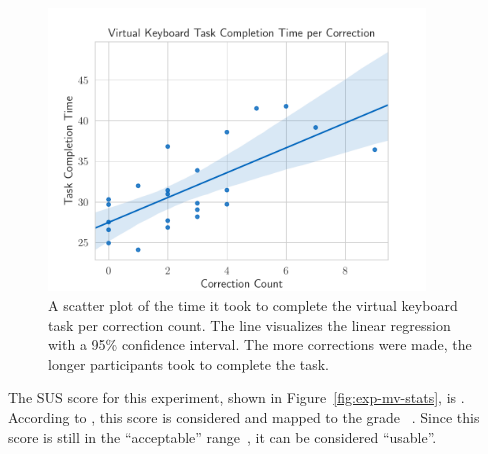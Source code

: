 \begin{figure}[H]
	\centering
	\includegraphics[width=10cm]{figures/evaluation/eval_exp_vk_ratio_scatter.pdf}
	\caption[Virtual keyboard task results]{A scatter plot of the time it took to complete the virtual keyboard task per correction count. The line visualizes the linear regression with a 95\% confidence interval. The more corrections were made, the longer participants took to complete the task.}\label{fig:eval-exp-vk-ratio-scatter}
\end{figure}

The \gls{SUS} score for this experiment, shown in Figure~\ref{fig:exp-mv-stats}, is \evalExpVkSusScore{}.
According to \citeauthor{Bangor.2009}, this score is considered \evalExpVkSusAdj{} and mapped to the grade \evalExpVkSusGrade~\cite[120\psq]{Bangor.2009}. Since this score is still in the \enquote{acceptable} range~\cite[120\psq]{Bangor.2009}, it can be considered \enquote{usable}.

